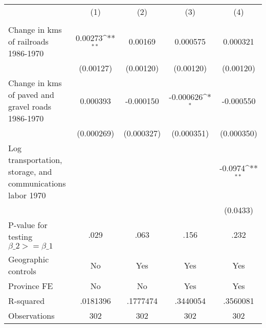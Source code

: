 {
\def\sym#1{\ifmmode^{#1}\else\(^{#1}\)\fi}
\begin{tabular}{l*{4}{c}}
\hline\hline
                &\multicolumn{1}{c}{(1)}&\multicolumn{1}{c}{(2)}&\multicolumn{1}{c}{(3)}&\multicolumn{1}{c}{(4)}\\
                &\multicolumn{1}{c}{}&\multicolumn{1}{c}{}&\multicolumn{1}{c}{}&\multicolumn{1}{c}{}\\
\hline
Change in kms of railroads 1986-1970&  0.00273\sym{**} &  0.00169         & 0.000575         & 0.000321         \\
                &(0.00127)         &(0.00120)         &(0.00120)         &(0.00120)         \\
[1em]
Change in kms of paved and gravel roads 1986-1970& 0.000393         &-0.000150         &-0.000626\sym{*}  &-0.000550         \\
                &(0.000269)         &(0.000327)         &(0.000351)         &(0.000350)         \\
[1em]
Log transportation, storage, and communications labor 1970&                  &                  &                  &  -0.0974\sym{**} \\
                &                  &                  &                  & (0.0433)         \\
\hline
P-value for testing $\beta\_{2} >= \beta\_{1}$&     .029         &     .063         &     .156         &     .232         \\
Geographic controls&       No         &      Yes         &      Yes         &      Yes         \\
Province FE     &       No         &       No         &      Yes         &      Yes         \\
R-squared       & .0181396         & .1777474         & .3440054         & .3560081         \\
Observations    &      302         &      302         &      302         &      302         \\
\hline\hline
\end{tabular}
}
